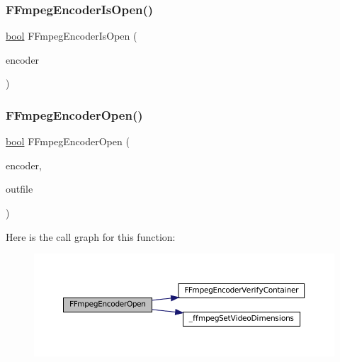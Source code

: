 \subsubsection{\texorpdfstring{F\+Fmpeg\+Encoder\+Is\+Open()}{FFmpegEncoderIsOpen()}}
{\footnotesize\ttfamily \mbox{\hyperlink{libretro_8h_a4a26dcae73fb7e1528214a068aca317e}{bool}} F\+Fmpeg\+Encoder\+Is\+Open (\begin{DoxyParamCaption}\item[{struct \mbox{\hyperlink{ffmpeg-encoder_8h_struct_f_fmpeg_encoder}{F\+Fmpeg\+Encoder}} $\ast$}]{encoder }\end{DoxyParamCaption})}

\mbox{\label{ffmpeg-encoder_8c_ae319fa73d21d047862d156fc05902af3}} 
\subsubsection{\texorpdfstring{F\+Fmpeg\+Encoder\+Open()}{FFmpegEncoderOpen()}}
{\footnotesize\ttfamily \mbox{\hyperlink{libretro_8h_a4a26dcae73fb7e1528214a068aca317e}{bool}} F\+Fmpeg\+Encoder\+Open (\begin{DoxyParamCaption}\item[{struct \mbox{\hyperlink{ffmpeg-encoder_8h_struct_f_fmpeg_encoder}{F\+Fmpeg\+Encoder}} $\ast$}]{encoder,  }\item[{const char $\ast$}]{outfile }\end{DoxyParamCaption})}

Here is the call graph for this function\+:
\nopagebreak
\begin{figure}[H]
\begin{center}
\leavevmode
\includegraphics[width=350pt]{ffmpeg-encoder_8c_ae319fa73d21d047862d156fc05902af3_cgraph}
\end{center}
\end{figure}
\mbox{\label{ffmpeg-encoder_8c_a2c0ebf9db7aa98077c9c0b128b329c28}} 
